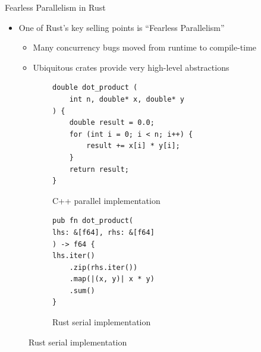 \documentclass[10pt,aspectratio=169]{beamer}
\begin{document}
\begin{frame}[fragile]{Fearless Parallelism in Rust}
    \begin{itemize}
        \item<1-> One of Rust's key selling points is ``Fearless Parallelism''
        \begin{itemize}
            \item Many concurrency bugs moved from runtime to compile-time
            \item Ubiquitous crates provide very high-level abstractions
        \end{itemize}
    \end{itemize}    
    \vspace*{0.15cm}

    \begin{figure}
        \begin{subfigure}[c]{.55\textwidth}\centering
            \begin{verbatim}
double dot_product (
    int n, double* x, double* y
) {
    double result = 0.0;
    for (int i = 0; i < n; i++) {
        result += x[i] * y[i];
    }
    return result;
}
            \end{verbatim}
            \label{fig:cpp-ddot-serial}
            \caption{C++ parallel implementation}
        \end{subfigure}%
        \begin{subfigure}[c]{.45\textwidth}\centering
            \begin{verbatim}
pub fn dot_product(
lhs: &[f64], rhs: &[f64]
) -> f64 {
lhs.iter()
    .zip(rhs.iter())
    .map(|(x, y)| x * y)
    .sum()
}
            \end{verbatim}
            \label{fig:rust-ddot-serial}
            \vspace*{0.5cm}
            \caption{Rust serial implementation}
        \end{subfigure}
    \end{figure}
\end{frame}
\end{document}
